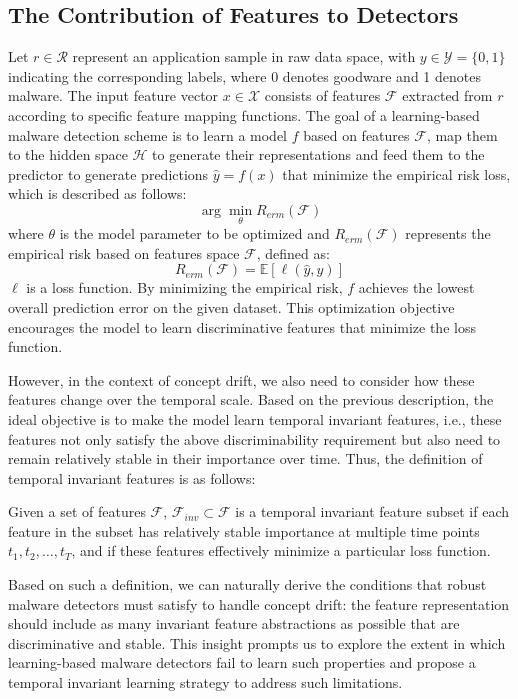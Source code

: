 \subsection{The Contribution of Features to Detectors}
 Let $r \in \mathcal{R}$ represent an application sample in raw data space, with $y \in \mathcal{Y} = \{0, 1\}$ indicating the corresponding labels, where 0 denotes goodware and 1 denotes malware. The input feature vector $x \in \mathcal{X}$ consists of features $\mathcal{F}$ extracted from $r$ according to specific feature mapping functions. The goal of a learning-based malware detection scheme is to learn a model $f$ based on features $\mathcal{F}$, map them to the hidden space $\mathcal{H}$ to generate their representations and feed them to the predictor to generate predictions $\hat{y} = f(x)$ that minimize the empirical risk loss, which is described as follows:
\begin{equation}
\arg \min _{\theta} R_{erm}\left(\mathcal{F}\right)
\end{equation}
where $\theta$ is the model parameter to be optimized and $R_{erm}(\mathcal{F})$ represents the empirical risk based on features space $\mathcal{F}$, defined as:
\begin{equation}
R_{erm}\left(\mathcal{F}\right)=\mathbb{E}[\ell(\hat{y}, y)]
\end{equation}
$\ell$ is a loss function. By minimizing the empirical risk, $f$ achieves the lowest overall prediction error on the given dataset. This optimization objective encourages the model to learn discriminative features that minimize the loss function.

However, in the context of concept drift, we also need to consider how these features change over the temporal scale. Based on the previous description, the ideal objective is to make the model learn temporal invariant features, i.e., these features not only satisfy the above discriminability requirement but also need to remain relatively stable in their importance over time. Thus, the definition of temporal invariant features is as follows:
\begin{myDef}
\label{Stable}
Given a set of features $\mathcal{F}$, $\mathcal{F}_{inv} \subset \mathcal{F}$ is a temporal invariant feature subset if each feature in the subset has relatively stable importance at multiple time points $t_1, t_2, \ldots, t_T$, and if these features effectively minimize a particular loss function.
\end{myDef}
 
Based on such a definition, we can naturally derive the conditions that robust malware detectors must satisfy to handle concept drift: the feature representation should include as many invariant feature abstractions as possible that are discriminative and stable. This insight prompts us to explore the extent in which learning-based malware detectors fail to learn such properties and propose a temporal invariant learning strategy to address such limitations. %



